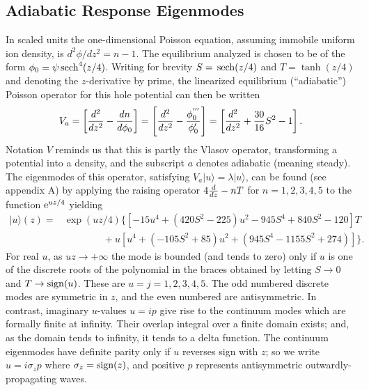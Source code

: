 \documentclass[12pt]{article}
\def\ket#1{|#1\rangle}
\def\sech{{\,\rm sech}}
\def\etothe#1{{\rm e}^{#1}}
\begin{document}
\subsection{Adiabatic Response Eigenmodes}
In scaled units the one-dimensional Poisson equation, assuming
immobile uniform ion density, is $d^2\phi/dz^2=n-1$. The equilibrium
analyzed is chosen to be of the form
$\phi_0=\psi\sech^4(z/4)$. Writing for brevity $S=\sech(z/4)$ and
$T=\tanh(z/4)$ and denoting the $z$-derivative by prime, the
linearized equilibrium (``adiabatic'') Poisson operator for this hole
potential can then be written
\begin{equation}
  \label{eq:1}
  V_a = \left[{d^2\over dz^2} - {dn\over d\phi_0}\right]
  = \left[{d^2\over dz^2} - {\phi_0^{'''}\over \phi_0'}\right]
  = \left[{d^2\over dz^2} +{30\over 16}S^2- 1\right].
\end{equation}
Notation $V$ reminds us that this is partly the Vlasov operator,
transforming a potential into a density, and the subscript $a$ denotes
adiabatic (meaning steady).  The eigenmodes of this
operator, satisfying $V_a\ket{u}=\lambda \ket{u}$, can be found (see
appendix A) by
applying the raising operator $4 {d\over dz}-n T$ for $n=1,2,3,4,5$ to
the function $ \etothe{uz/4}$ yielding
\begin{equation}
  \label{eq:2}
  \begin{split}
 \ket{u}(z)= &\exp(uz/4)\{[-15u^4 + (420S^2 - 225)u^2 - 945S^4 +
 840S^2 - 120]T \\
 &\qquad\qquad+ u[u^4 + (-105S^2 + 85)u^2 + (945S^4 - 1155S^2
 +274)]\}.
\end{split}
\end{equation}
For real $u$, as $u z\to+\infty$ the mode is bounded (and tends to
zero) only if $u$ is one of the discrete roots of the polynomial in
the braces obtained by letting $S\to 0$ and $T\to {\rm sign}(u)$. These
are $u=j=1,2,3,4,5$. The odd numbered discrete modes are symmetric in
$z$, and the even numbered are antisymmetric. In contrast, imaginary
$u$-values $u=ip$ give rise to the continuum modes which are formally
finite at infinity. Their overlap integral over a finite domain
exists; and, as the domain tends to infinity, it tends to a delta
function. The continuum eigenmodes have definite parity only if $u$
reverses sign with $z$; so we write $u=i \sigma_z p$ where
$\sigma_z={\rm sign}(z)$, and positive $p$ represents antisymmetric
outwardly-propagating waves.
\end{document}
